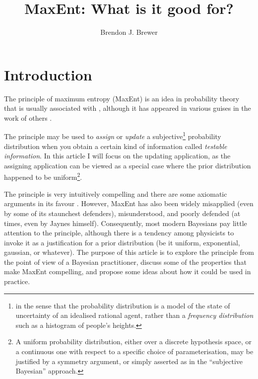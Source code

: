 \documentclass[a4paper, 11pt]{article}
\title{MaxEnt: What is it good for?}
\author{Brendon J. Brewer}
\begin{document}
\maketitle


\section{Introduction}
The principle of maximum entropy (MaxEnt) is an idea in probability theory
that is usually associated with \citet{jaynes}, although it has appeared in
various guises in the work of others \citep[e.g.][]{gibbs, boltzmann, shannon}.

The principle may be used
to {\it assign} or {\it update} a
subjective\footnote{in the sense that the probability distribution is a model
of the state of uncertainty of an idealised rational agent, rather than
a {\it frequency distribution} such as a histogram of people's heights.}
probability distribution when you obtain a certain kind of information
called {\it testable information}. In this article I will focus on the
updating application, as the assigning application can be viewed as a special
case where the prior distribution happened to be
uniform\footnote{A uniform probability distribution, either over a discrete
hypothesis space, or a continuous one with respect to a specific choice of
parameterisation, may be justified by a symmetry argument, or simply asserted
as in the ``subjective Bayesian'' approach.}.

The principle is very intuitively compelling
and there are some axiomatic arguments in its favour
\citep[e.g.][]{2010arXiv1008.4831K}. However, MaxEnt has also been widely
misapplied (even by some of its staunchest defenders), misunderstood,
and poorly defended (at times, even by Jaynes himself).
Consequently, most modern Bayesians pay little attention to the principle,
although there is a tendency among physicists to invoke it as a justification
for a prior distribution (be it uniform, exponential, gaussian, or whatever).
The purpose of this article is to explore the principle from the point of
view of a Bayesian practitioner, discuss some of the properties that
make MaxEnt compelling, and propose some ideas about how it could be used in
practice.
\end{document}
